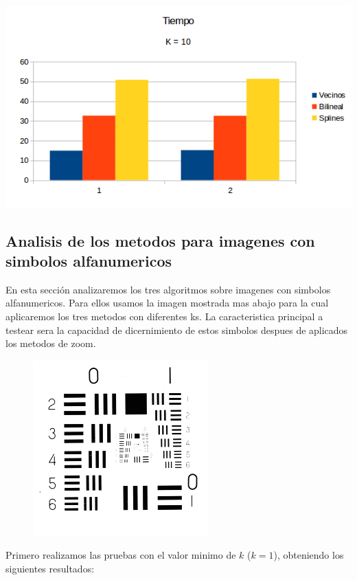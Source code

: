 \begin{center}
\includegraphics[scale=0.50]{imagenes/K10T.png}
\end{center}

\subsection{Analisis de los metodos para imagenes con simbolos alfanumericos}
En esta sección analizaremos los tres algoritmos sobre imagenes con simbolos alfanumericos. Para ellos usamos la imagen mostrada mas abajo para la cual aplicaremos los tres metodos con diferentes ks. La caracteristica principal a testear sera la capacidad de dicernimiento de estos simbolos despues de aplicados los metodos de zoom.

\begin{figure}[H]
\centering
\includegraphics[scale=0.50]{fotos/alfanum/orig.png}
\end{figure}

Primero realizamos las pruebas con el valor minimo de $k$ ($k=1$), obteniendo los siguientes resultados:



